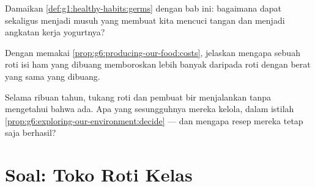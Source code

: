 \begin{exercise}[$\star\star$]\label{exo:g6:producing-our-food:10}
Damaikan \cref{def:g1:healthy-habits:germs} dengan bab ini: bagaimana
 dapat sekaligus menjadi musuh yang membuat kita mencuci tangan
dan menjadi angkatan kerja yogurtnya?
\end{exercise}

\begin{exercise}[$\star\star$]\label{exo:g6:producing-our-food:11}
Dengan memakai \cref{prop:g6:producing-our-food:costs}, jelaskan
mengapa sebuah roti isi ham yang dibuang memboroskan lebih banyak
daripada roti dengan berat yang sama yang dibuang.
\end{exercise}

\begin{exercise}[$\star\star\star$]\label{exo:g6:producing-our-food:12}
Selama ribuan tahun, tukang roti dan pembuat bir menjalankan
 tanpa mengetahui bahwa  ada. Apa yang sesungguhnya
mereka kelola, dalam istilah
\cref{prop:g6:exploring-our-environment:decide} --- dan mengapa resep
mereka tetap saja berhasil?
\end{exercise}

\section{Soal: Toko Roti Kelas}

